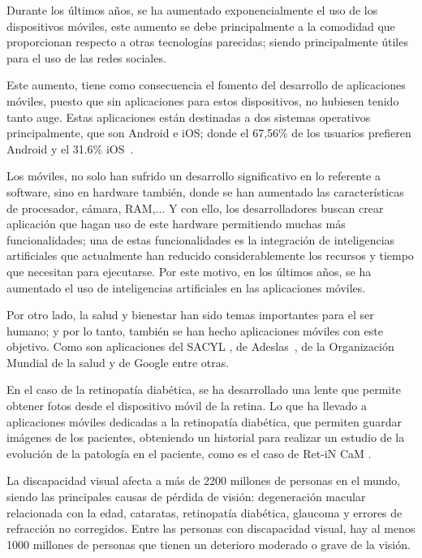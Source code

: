 
Durante los últimos años, se ha aumentado exponencialmente el uso de los dispositivos móviles, este aumento se debe principalmente a la comodidad que proporcionan respecto a otras tecnologías parecidas; siendo principalmente útiles para el uso de las redes sociales. 

Este aumento, tiene como consecuencia el fomento del desarrollo de aplicaciones móviles, puesto que sin aplicaciones para estos dispositivos, no hubiesen tenido tanto auge. Estas aplicaciones están destinadas a dos sistemas operativos principalmente, que son Android e iOS; donde el 67,56\% de los usuarios prefieren Android y el 31.6\% iOS~\cite{mobile-os-market-share}.

Los móviles, no solo han sufrido un desarrollo significativo en lo referente a software, sino en hardware también, donde se han aumentado las características de procesador, cámara, RAM,...  Y con ello, los desarrolladores buscan crear aplicación que hagan uso de este hardware permitiendo muchas más funcionalidades; una de estas funcionalidades es la integración de inteligencias artificiales que actualmente han reducido considerablemente los recursos y tiempo que necesitan para ejecutarse. Por este motivo, en los últimos años, se ha aumentado el uso de inteligencias artificiales en las aplicaciones móviles.

Por otro lado, la salud y bienestar han sido temas importantes para el ser humano; y por lo tanto, también se han hecho aplicaciones móviles con este objetivo. Como son aplicaciones del SACYL \cite{sacyl-app}, de Adeslas~\cite{adeslas}, de la Organización Mundial de la salud \cite{who-infoapp} y de Google\cite{google-fitness-app} entre otras.

En el caso de la retinopatía diabética, se ha desarrollado una lente que permite obtener fotos desde el dispositivo móvil de la retina. Lo que ha llevado a aplicaciones móviles dedicadas a la retinopatía diabética, que permiten guardar imágenes de los pacientes, obteniendo un historial para realizar un estudio de la evolución de la patología en el paciente, como es el caso de Ret-iN CaM\cite{ret-in-cam} .

La discapacidad visual afecta a más de 2200 millones de personas en el mundo, siendo las principales causas de pérdida de visión: degeneración macular relacionada con la edad, cataratas, retinopatía diabética, glaucoma y errores de refracción no corregidos.
Entre las personas con discapacidad visual, hay al menos 1000 millones de personas que tienen un deterioro moderado o grave de la visión\cite{oms-ceguera}.


